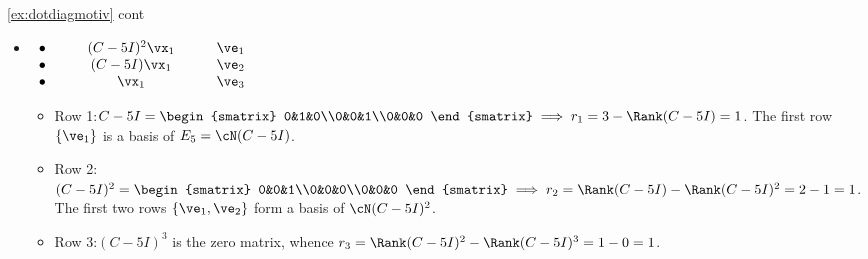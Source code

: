 \begin{example*}{\ref{ex:dotdiagmotiv} cont}{}
\begin{itemize}
		
	\item[$C:$] $\begin{array}[t]{lll}
		\bullet\\\bullet\\\bullet
		\end{array}
		\qquad
		\begin{array}[t]{c}
		(C-5I)^2\vx_1\\
		(C-5I)\vx_1\\
		\vx_1
		\end{array}
		\qquad
		\begin{array}[t]{l}
		\ve_1\\\ve_2\\\ve_3
		\end{array}$
		\begin{itemize}
		  \item[]\hspace*{-20pt}Row 1:\quad $C-5I=\smash[t]{\begin{smatrix}
			0&1&0\\0&0&1\\0&0&0
		  \end{smatrix}}			\implies r_1=3-\Rank(C-5I)=1$. The first row $\{\ve_1\}$ is a basis of $E_5=\cN(C-5I)$.
			\item[]\hspace*{-20pt}Row 2:\quad $(C-5I)^2=\begin{smatrix}
			0&0&1\\0&0&0\\0&0&0
			\end{smatrix}\implies r_2=\Rank(C-5I)-\Rank(C-5I)^2=2-1=1$. The first two rows $\{\ve_1,\ve_2\}$ form a basis of $\cN(C-5I)^2$.
			\item[]\hspace*{-20pt}Row 3:\quad $(C-5I)^3$ is the zero matrix, whence $r_3=\Rank(C-5I)^2-\Rank(C-5I)^3=1-0=1$.
		\end{itemize}
\end{itemize}
\end{example*}

